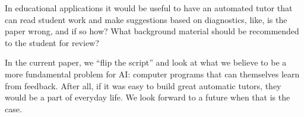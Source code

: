 \documentclass[letter]{article}
\begin{document}

%
%
%
%

%
%

In educational applications it would be useful to have an automated tutor that can read student work and make suggestions based on diagnostics, like, is the paper wrong, and if so how?  What background material should be recommended to the student for review?

In the current paper, we ``flip the script'' and look at what we believe to be a more fundamental problem for AI: computer programs that can themselves learn from feedback.  After all, if it was easy to build great automatic tutors, they would be a part of everyday life.  We look forward to a future when that is the case.
\end{document}

